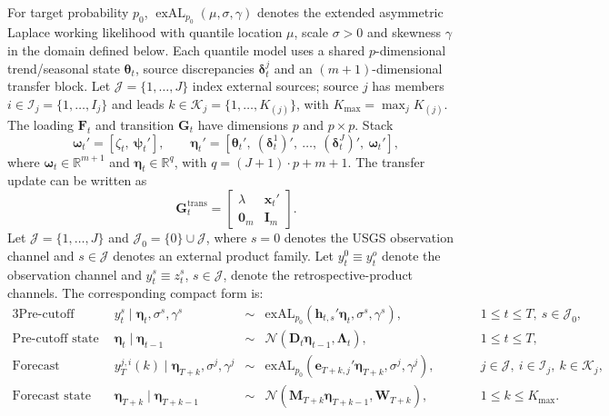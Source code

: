 For target probability $p_0$, $\operatorname{exAL}_{p_0}(\mu,\sigma,\gamma)$ denotes the extended asymmetric Laplace working likelihood with quantile location $\mu$, scale $\sigma>0$ and skewness $\gamma$ in the domain defined below. Each quantile model uses a shared $p$-dimensional trend/seasonal state $\boldsymbol\theta_t$, source discrepancies $\boldsymbol\delta_t^j$ and an $(m+1)$-dimensional transfer block. Let $\mathcal J=\{1,\ldots,J\}$ index external sources; source $j$ has members $i\in\mathcal I_j=\{1,\ldots,I_j\}$ and leads $k\in\mathcal K_j=\{1,\ldots,K_{(j)}\}$, with $K_{\max}=\max_jK_{(j)}$. The loading $\mathbf F_t$ and transition $\mathbf G_t$ have dimensions $p$ and $p\times p$. Stack
\[
\boldsymbol{\omega}_t' = [\zeta_t,\ \boldsymbol{\psi}_t'], \qquad
\boldsymbol{\eta}_t' = [\boldsymbol{\theta}_t',\ (\boldsymbol{\delta}_t^1)',\ \ldots,\ (\boldsymbol{\delta}_t^J)',\ \boldsymbol{\omega}_t'],
\]
where \(\boldsymbol{\omega}_t \in \mathbb{R}^{m+1}\) and \(\boldsymbol{\eta}_t \in \mathbb{R}^{q}\), with \(q = (J+1)\cdot p + m + 1\). The transfer update can be written as
\[
\mathbf{G}^{\text{trans}}_t =
\begin{bmatrix}
\lambda & \mathbf{x}_t' \\
\mathbf{0}_m & \mathbf{I}_m
\end{bmatrix}.
\]
Let $\mathcal J=\{1,\ldots,J\}$ and \(\mathcal{J}_0=\{0\}\cup\mathcal{J}\), where \(s=0\) denotes the USGS observation channel and \(s\in\mathcal{J}\) denotes an external product family. Let \(y_t^0 \equiv y_t^o\) denote the observation channel and \(y_t^s \equiv z_t^s\), \(s\in\mathcal{J}\), denote the retrospective-product channels. The corresponding compact form is:
\begin{alignat}{3}
\text{Pre-cutoff observations:}\quad&
y_t^s \mid \boldsymbol{\eta}_t, \sigma^s, \gamma^s
&\sim{}& \text{exAL}_{p_0}\!\left(\mathbf{h}_{t,s}' \boldsymbol{\eta}_t, \sigma^s, \gamma^s\right),
&\qquad& 1 \le t \le T,\ s \in \mathcal{J}_0, \label{eq:compact_est_obs}
\\
\text{Pre-cutoff state evolution:}\quad&
\boldsymbol{\eta}_t \mid \boldsymbol{\eta}_{t-1}
&\sim{}& \mathcal{N}\!\left(\boldsymbol{D}_t \boldsymbol{\eta}_{t-1}, \boldsymbol{\Lambda}_t\right),
&\qquad& 1 \le t \le T, \label{eq:compact_est_state}
\\
\text{Forecast observations:}\quad&
y_T^{j,i}(k) \mid \boldsymbol{\eta}_{T+k}, \sigma^j, \gamma^j
&\sim{}& \text{exAL}_{p_0}\!\left(\mathbf{e}_{T+k,j}' \boldsymbol{\eta}_{T+k}, \sigma^j, \gamma^j\right),
&\qquad& j \in \mathcal{J},\ i \in \mathcal{I}_j,\ k \in \mathcal{K}_j, \label{eq:compact_fc_obs}
\\
\text{Forecast state evolution:}\quad&
\boldsymbol{\eta}_{T+k} \mid \boldsymbol{\eta}_{T+k-1}
&\sim{}& \mathcal{N}\!\left(\boldsymbol{M}_{T+k} \boldsymbol{\eta}_{T+k-1}, \mathbf{W}_{T+k}\right),
&\qquad& 1 \le k \le K_{\max}. \label{eq:compact_fc_state}
\end{alignat}

